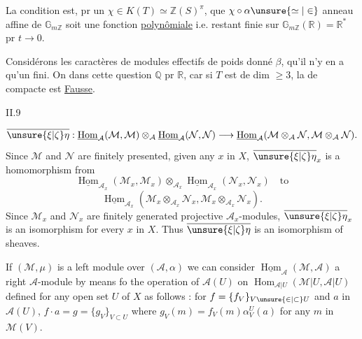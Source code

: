 
La condition est,  pr un $\chi\in K(T)\simeq\mathbb Z(S)^\pi$, que $\chi\circ\alpha\unsure{\simeq|\in}$  anneau affine de $\mathbb G_{m\mathbb Z}$ soit une fonction \uline{polynômiale} i.e. restant finie sur $\mathbb G_{m\mathbb Z}(\mathbb R)=\mathbb R^*$ pr $t\to0$.

Considérons les caractères de modules effectifs de poids donné $\beta$,  qu'il n'y en a qu'un  fini. On     dans cette question $\mathbb Q$ pr $\mathbb R$,  car si $T$ est de dim $\geq3$, la  de  compacte est \uline{Fausse}.




II.9

\[
\overline{\unsure{\xi|\zeta}\eta}:\underline{\operatorname{Hom}}_{\mathcal A}(\mathcal M,\mathcal M)\otimes_{\mathcal A}\underline{\operatorname{Hom}}_{\mathcal A}(\mathcal N,\mathcal N)\longrightarrow\underline{\operatorname{Hom}}_{\mathcal A}(\mathcal M\otimes_{\mathcal A}\mathcal N,\mathcal M\otimes_{\mathcal A}\mathcal N).
\]
Since $\mathcal M$ and $\mathcal N$ are finitely presented, given any $x$ in $X$, $\overline{\unsure{\xi|\zeta}\eta}_x$ is
a homomorphism from
\[
\underline{\operatorname{Hom}}_{\mathcal A_x}(\mathcal M_x,\mathcal M_x)\otimes_{\mathcal A_x}\underline{\operatorname{Hom}}_{\mathcal A_x}(\mathcal N_x,\mathcal N_x)\quad\text{to}
\]
\[
\underline{\operatorname{Hom}}_{\mathcal A_x}(\mathcal M_x\otimes_{\mathcal A_x}\mathcal N_x,\mathcal M_x\otimes_{\mathcal A_x}\mathcal N_x).
\]
Since $\mathcal M_x$ and $\mathcal N_x$ are finitely generated projective $\mathcal A_x$-modules,
$\overline{\unsure{\xi|\zeta}\eta}_x$ is an isomorphism for every $x$ in $X$. Thus $\overline{\unsure{\xi|\zeta}\eta}$ is an isomorphism of sheaves.

If $(\mathcal M,\mu)$ is a left module over $(\mathcal A,\alpha)$ we can consider
$\underline{\operatorname{Hom}}_{\mathcal A}(\mathcal M,\mathcal A)$ a right $\mathcal A$-module by means fo the operation of
$\mathcal A(U)$ on $\operatorname{Hom}_{\mathcal A|U}(\mathcal M|U,\mathcal A|U)$ defined for any open set $U$ of $X$
as follows : for $f=\{f_V\}_{V\unsure{\in|\subset}U}$ and $a$ in $\mathcal A(U)$, $f\cdot a=g=\{g_V\}_{V\subset U}$
where $g_V(m)=f_V(m)\alpha_V^U(a)$ for any $m$ in $\mathcal M(V)$.


